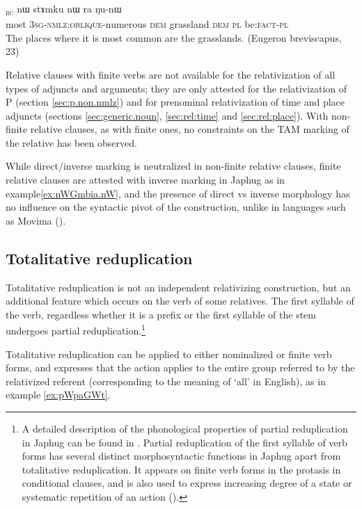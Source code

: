\documentclass[oldfontcommands,oneside,a4paper,11pt]{article}
\newcommand{\ipa}[1]{{\phon #1}} %
\newcommand{\topic}{\textsc{dem}}
\newcommand{\rc}{\textsubscript{\textsc{rc}}}
\begin{document}
\begin{exe}
   \ex \label{ex:WsAdAn}
 \gll  
  [\ipa{stu}   	\ipa{ɯ-sɤ-dɤn}]\rc{}   	\ipa{nɯ}   	\ipa{stɤmku}   	\ipa{nɯ} \ipa{ra}   	\ipa{ŋu-nɯ}   \\
most \textsc{3sg-nmlz:oblique}-numerous \topic{} grassland \topic{} \textsc{pl} be:\textsc{fact}-\textsc{pl} \\
\glt The places where it is most common are the grasslands. (Eugeron breviscapus, 23)
    \end{exe}
    

	  
	Relative clauses with finite verbs are not available for the relativization of all types of adjuncts and arguments; they are only attested for the relativization of P (section \ref{sec:p.non.nmlz}) and for prenominal relativization of time and place adjuncts (sections \ref{sec:generic.noun}, \ref{sec:rel:time} and \ref{sec:rel:place}). With non-finite relative clauses, as with finite ones, no constraints on the TAM marking of the relative has been observed. 
	
While direct/inverse marking is neutralized in non-finite relative clauses, finite relative clauses are attested with inverse marking in Japhug as in example\ref{ex:nWGmbia.nW}, and the presence of direct vs inverse morphology has no influence on the syntactic pivot of the construction, unlike in languages such as Movima (\citealt{haude09hierarchical}).

	
\subsection{Totalitative reduplication} \label{sec:redp}
Totalitative reduplication is not an independent relativizing construction, but an additional feature which occurs on the verb of some relatives. The first syllable of the verb, regardless whether it is a prefix or the first syllable of the stem undergoes partial reduplication.\footnote{A detailed description of the phonological properties of partial reduplication in Japhug   can be found in \citet{jacques04these, jacques07redupl}. Partial reduplication of the first syllable of   verb forms has several distinct morphosyntactic functions in Japhug apart from totalitative reduplication. It appears on  finite verb forms in the protasis in conditional clauses, and is also used to express increasing degree of a state or systematic repetition of an action (\citealt{jacques07redupl}).}


Totalitative reduplication  can be applied to either nominalized or finite verb forms, and expresses that the action applies to the entire group referred to by the relativized referent (corresponding to the meaning of `all' in English), as in example \ref{ex:pWpaGWt}.
\end{document}
